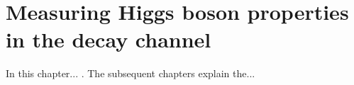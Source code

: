 \chapter{Measuring Higgs boson properties in the \Hgg decay channel}
\label{chap:hgg_overview}

In this chapter... . The subsequent chapters explain the...
